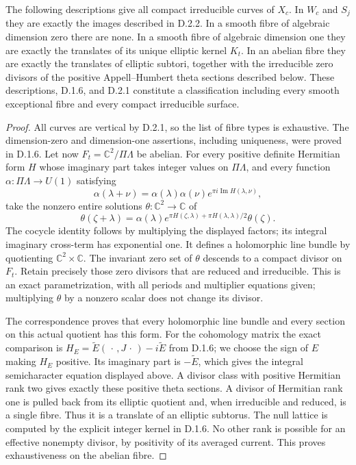 \begin{theorem}\label{st:D.2.3}
The following descriptions give all compact irreducible curves of $X_c$.
In $W_c$ and $S_j$ they are exactly the images described in D.2.2.
In a smooth fibre of algebraic dimension zero there are none. In a
smooth fibre of algebraic dimension one they are exactly the translates
of its unique elliptic kernel $K_t$. In an abelian fibre they are exactly
the translates of elliptic subtori, together with the irreducible zero
divisors of the positive Appell--Humbert theta sections described below.
These descriptions, D.1.6, and D.2.1 constitute a classification including
every smooth exceptional fibre and every compact irreducible surface.
\end{theorem}
\begin{proof}
All curves are vertical by D.2.1, so the list of fibre types is exhaustive.
The dimension-zero and dimension-one assertions, including uniqueness,
were proved in D.1.6. Let now $F_t=\mathbb C^2/\Pi\Lambda$ be abelian.
For every positive definite Hermitian form $H$ whose imaginary part takes
integer values on $\Pi\Lambda$, and every function
$\alpha:\Pi\Lambda\to U(1)$ satisfying
\[
 \alpha(\lambda+\nu)=\alpha(\lambda)\alpha(\nu)
                 e^{\pi i\operatorname{Im}H(\lambda,\nu)},
\]
take the nonzero entire solutions $\theta:\mathbb C^2\to\mathbb C$ of
\begin{equation}\label{eq:cd-theta-sections}
 \theta(\zeta+\lambda)=\alpha(\lambda)
 e^{\pi H(\zeta,\lambda)+\pi H(\lambda,\lambda)/2}\theta(\zeta).
\end{equation}
The cocycle identity follows by multiplying the displayed factors; its
integral imaginary cross-term has exponential one. It defines a
holomorphic line bundle by quotienting $\mathbb C^2\times\mathbb C$.
The invariant zero set of $\theta$ descends to a compact divisor on
$F_t$. Retain precisely those zero divisors that are reduced and
irreducible. This is an exact parametrization, with all periods and
multiplier equations given; multiplying $\theta$ by a nonzero scalar
does not change its divisor.

The correspondence \cite[Theorem 4.1 and equation (4.3)]{Schnell19} proves
that every holomorphic line bundle and every section on this actual
quotient has this form. For the cohomology matrix the exact comparison is
$H_E=\widetilde E(\,\cdot\,,J\,\cdot\,)-i\widetilde E$ from D.1.6;
we choose the sign of $E$ making $H_E$ positive. Its imaginary part is
$-\widetilde E$, which gives the integral semicharacter equation displayed
above. A divisor class with positive Hermitian rank two gives exactly
these positive theta sections. A divisor of Hermitian rank one is pulled
back from its elliptic quotient and, when irreducible and reduced, is a
single fibre. Thus it is a translate of an elliptic subtorus. The null
lattice is computed by the explicit integer kernel in D.1.6. No other
rank is possible for an effective nonempty divisor, by positivity of its
averaged current. This proves exhaustiveness on the abelian fibre.


\end{proof}
